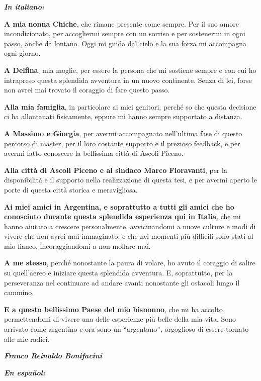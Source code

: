 \documentclass[a4paper, 12pt, twoside]{report}  %
\begin{document}
\textbf{\textit{In italiano:}}

\textbf{A mia nonna Chiche}, che rimane presente come sempre. Per il suo amore incondizionato, per accogliermi sempre con un sorriso e per sostenermi in ogni passo, anche da lontano. Oggi mi guida dal cielo e la sua forza mi accompagna ogni giorno.

\textbf{A Delfina}, mia moglie, per essere la persona che mi sostiene sempre e con cui ho intrapreso questa splendida avventura in un nuovo continente. Senza di lei, forse non avrei mai trovato il coraggio di fare questo passo.

\textbf{Alla mia famiglia}, in particolare ai miei genitori, perché so che questa decisione ci ha allontanati fisicamente, eppure mi hanno sempre supportato a distanza.

\textbf{A Massimo e Giorgia}, per avermi accompagnato nell’ultima fase di questo percorso di master, per il loro costante supporto e il prezioso feedback, e per avermi fatto conoscere la bellissima città di Ascoli Piceno.

\textbf{Alla città di Ascoli Piceno e al sindaco Marco Fioravanti}, per la disponibilità e il supporto nella realizzazione di questa tesi, e per avermi aperto le porte di questa città storica e meravigliosa.

\textbf{Ai miei amici in Argentina, e soprattutto a tutti gli amici che ho conosciuto durante questa splendida esperienza qui in Italia}, che mi hanno aiutato a crescere personalmente, avvicinandomi a nuove culture e modi di vivere che non avrei mai immaginato, e che nei momenti più difficili sono stati al mio fianco, incoraggiandomi a non mollare mai.

\textbf{A me stesso}, perché nonostante la paura di volare, ho avuto il coraggio di salire su quell’aereo e iniziare questa splendida avventura. E, soprattutto, per la perseveranza nel continuare ad andare avanti nonostante gli ostacoli lungo il cammino.

\textbf{E a questo bellissimo Paese del mio bisnonno}, che mi ha accolto permettendomi di vivere una delle esperienze più belle della mia vita. Sono arrivato come argentino e ora sono un “argentano”, orgoglioso di essere tornato alle mie radici.

\begin{flushright}
    \textbf{\textit{Franco Reinaldo Bonifacini}}\\[0.1cm]
\end{flushright}

\newpage
\textbf{\textit{En español:}}
\end{document}
